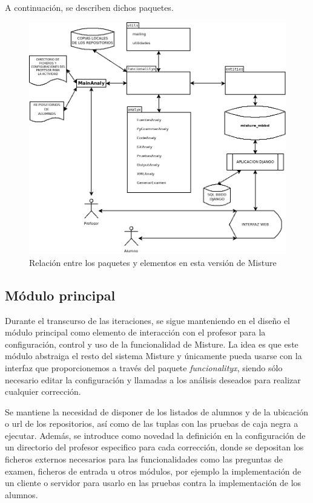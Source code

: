 A continuación, se describen dichos paquetes.

\begin{figure}[H]
   \centering
   \includegraphics[width=16cm]{img/Diagram3_iteracion2}
   \caption{Relación entre los paquetes y elementos en esta versión de Misture}
   \label{figura:regex}
\end{figure}



\subsection{Módulo principal} 
\label{subsec:mod_principal}

Durante el transcurso de las iteraciones, se sigue manteniendo en el diseño el módulo principal como elemento de interacción con el profesor para la configuración, control y uso de la funcionalidad de Misture. La idea es que este módulo abstraiga el resto del sistema Misture y únicamente pueda usarse con la interfaz que proporcionemos a través del paquete \textit{funcionalityx}, siendo sólo necesario editar la configuración y llamadas a los análisis deseados para realizar cualquier corrección.


Se mantiene la necesidad de disponer de los listados de alumnos y de la ubicación o url de los repositorios, así como de las tuplas con las pruebas de caja negra a ejecutar. Además, se introduce como novedad la definición en la configuración de un directorio del profesor especifico para cada corrección, donde se depositan los ficheros externos necesarios para las funcionalidades como las preguntas de examen, ficheros de entrada u otros módulos, por ejemplo la implementación de un cliente o servidor para usarlo en las pruebas contra la implementación de los alumnos.

